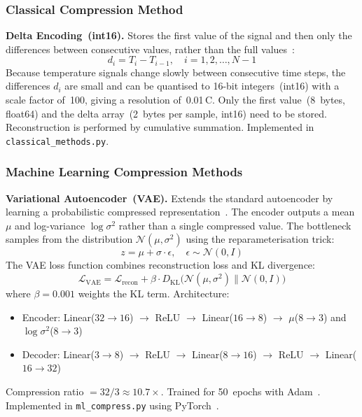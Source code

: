 \subsubsection*{Classical Compression Method}

\textbf{Delta Encoding~(int16).} Stores the first value of the signal and then only the differences between consecutive values, rather than the full values~\cite{lossless_compression}:
\begin{equation}
d_i = T_i - T_{i-1}, \quad i = 1, 2, \ldots, N-1
\label{eq:delta}
\end{equation}
Because temperature signals change slowly between consecutive time steps, the differences $d_i$ are small and can be quantised to 16-bit integers~(int16) with a scale factor of~100, giving a resolution of~0.01\,\textdegree C. Only the first value~(8~bytes, float64) and the delta array~(2~bytes per sample, int16) need to be stored. Reconstruction is performed by cumulative summation. Implemented in \texttt{classical\_methods.py}.

\subsubsection*{Machine Learning Compression Methods}

\textbf{Variational Autoencoder~(VAE).} Extends the standard autoencoder by learning a probabilistic compressed representation~\cite{autoencoder_compression}. The encoder outputs a mean $\mu$ and log-variance $\log\sigma^2$ rather than a single compressed value. The bottleneck samples from the distribution $\mathcal{N}(\mu, \sigma^2)$ using the reparameterisation trick:
\begin{equation}
z = \mu + \sigma \cdot \epsilon, \quad \epsilon \sim \mathcal{N}(0, I)
\label{eq:vae_reparam}
\end{equation}
The VAE loss function combines reconstruction loss and KL divergence:
\begin{equation}
\mathcal{L}_{\text{VAE}} = \mathcal{L}_{\text{recon}} + \beta \cdot D_{\text{KL}}\bigl(\mathcal{N}(\mu, \sigma^2) \| \mathcal{N}(0, I)\bigr)
\label{eq:vae_loss}
\end{equation}
where $\beta = 0.001$ weights the KL term. Architecture:
\begin{itemize}[nosep]
\item Encoder: Linear($32\!\to\!16$) $\to$ ReLU $\to$ Linear($16\!\to\!8$) $\to$ $\mu$($8\!\to\!3$) and $\log\sigma^2$($8\!\to\!3$)
\item Decoder: Linear($3\!\to\!8$) $\to$ ReLU $\to$ Linear($8\!\to\!16$) $\to$ ReLU $\to$ Linear($16\!\to\!32$)
\end{itemize}
Compression ratio $= 32/3 \approx 10.7\times$. Trained for 50~epochs with Adam~\cite{kingma2014adam}. Implemented in \texttt{ml\_compress.py} using PyTorch~\cite{pytorch}.

